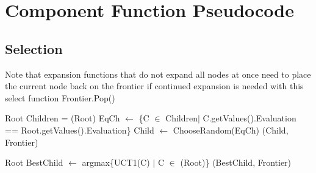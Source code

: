\section{Component Function Pseudocode}
\label{appendix:componentfunctions}

\subsection*{Selection}
\begin{algorithm}[H]
    \begin{algorithmic}[1]
            \State \Comment Note that expansion functions that do not expand all nodes at once need to place the current node back on the frontier if continued expansion is needed with this select function
            \State \Return Frontier.Pop()
        \EndProcedure
    \end{algorithmic}    
\end{algorithm}

\begin{algorithm}[H]
    \begin{algorithmic}[1]
                \State \Return Root
            \Else
                \State Children = (Root)
                \State EqCh $\gets$ \{C $\in$  Children$|$ C.getValues().Evaluation == Root.getValues().Evaluation\}
                \State Child $\gets$ ChooseRandom(EqCh)
                \State \Return {}(Child, Frontier)
            \EndIf
        \EndProcedure
    \end{algorithmic}    
\end{algorithm}

\begin{algorithm}[H]
    \begin{algorithmic}[1]
                \State \Return Root
            \EndIf
            \State BestChild $\gets$ argmax\{UCT1(C) $|$ C $\in$ (Root)\}
            \State \Return {}(BestChild, Frontier)
        \EndProcedure
    \end{algorithmic}    
\end{algorithm}

